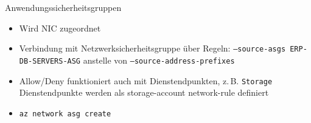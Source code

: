 \begin{flashcard}[Definition]{Anwendungssicherheitsgruppen}
    \begin{itemize}
        \item Wird NIC zugeordnet
        \item Verbindung mit Netzwerksicherheitsgruppe über Regeln:\newline
            \texttt{--source-asgs ERP-DB-SERVERS-ASG} anstelle von \texttt{--source-address-prefixes}
        \item Allow/Deny funktioniert auch mit Dienstendpunkten, z.\,B. \texttt{Storage} \newline
            Dienstendpunkte werden als storage-account network-rule definiert
        \item \texttt{az network asg create}
    \end{itemize}
\end{flashcard}
